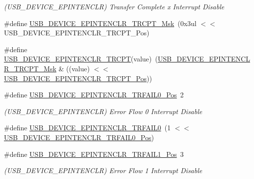 \begin{DoxyCompactItemize}
\begin{DoxyCompactList}\small\item\em (U\+S\+B\+\_\+\+D\+E\+V\+I\+C\+E\+\_\+\+E\+P\+I\+N\+T\+E\+N\+C\+LR) Transfer Complete x Interrupt Disable \end{DoxyCompactList}\item 
\#define \mbox{\hyperlink{group___s_a_m_d21___u_s_b_gaf5f4e9555d58b985f4bbe3f05382c43c}{U\+S\+B\+\_\+\+D\+E\+V\+I\+C\+E\+\_\+\+E\+P\+I\+N\+T\+E\+N\+C\+L\+R\+\_\+\+T\+R\+C\+P\+T\+\_\+\+Msk}}~(0x3ul $<$$<$ U\+S\+B\+\_\+\+D\+E\+V\+I\+C\+E\+\_\+\+E\+P\+I\+N\+T\+E\+N\+C\+L\+R\+\_\+\+T\+R\+C\+P\+T\+\_\+\+Pos)
\item 
\#define \mbox{\hyperlink{group___s_a_m_d21___u_s_b_ga32a91659ae0ef4c5260701d04262d117}{U\+S\+B\+\_\+\+D\+E\+V\+I\+C\+E\+\_\+\+E\+P\+I\+N\+T\+E\+N\+C\+L\+R\+\_\+\+T\+R\+C\+PT}}(value)~(\mbox{\hyperlink{group___s_a_m_d21___u_s_b_gaf5f4e9555d58b985f4bbe3f05382c43c}{U\+S\+B\+\_\+\+D\+E\+V\+I\+C\+E\+\_\+\+E\+P\+I\+N\+T\+E\+N\+C\+L\+R\+\_\+\+T\+R\+C\+P\+T\+\_\+\+Msk}} \& ((value) $<$$<$ \mbox{\hyperlink{group___s_a_m_d21___u_s_b_ga049c9272ae142ffc562966dc3debdd0f}{U\+S\+B\+\_\+\+D\+E\+V\+I\+C\+E\+\_\+\+E\+P\+I\+N\+T\+E\+N\+C\+L\+R\+\_\+\+T\+R\+C\+P\+T\+\_\+\+Pos}}))
\item 
\#define \mbox{\hyperlink{group___s_a_m_d21___u_s_b_gaa64f9c594de2fffaef8e11b9ecaa0efc}{U\+S\+B\+\_\+\+D\+E\+V\+I\+C\+E\+\_\+\+E\+P\+I\+N\+T\+E\+N\+C\+L\+R\+\_\+\+T\+R\+F\+A\+I\+L0\+\_\+\+Pos}}~2
\begin{DoxyCompactList}\small\item\em (U\+S\+B\+\_\+\+D\+E\+V\+I\+C\+E\+\_\+\+E\+P\+I\+N\+T\+E\+N\+C\+LR) Error Flow 0 Interrupt Disable \end{DoxyCompactList}\item 
\#define \mbox{\hyperlink{group___s_a_m_d21___u_s_b_ga6e6a507b0b9d7370dfee72051b6aede7}{U\+S\+B\+\_\+\+D\+E\+V\+I\+C\+E\+\_\+\+E\+P\+I\+N\+T\+E\+N\+C\+L\+R\+\_\+\+T\+R\+F\+A\+I\+L0}}~(1 $<$$<$ \mbox{\hyperlink{group___s_a_m_d21___u_s_b_gaa64f9c594de2fffaef8e11b9ecaa0efc}{U\+S\+B\+\_\+\+D\+E\+V\+I\+C\+E\+\_\+\+E\+P\+I\+N\+T\+E\+N\+C\+L\+R\+\_\+\+T\+R\+F\+A\+I\+L0\+\_\+\+Pos}})
\item 
\#define \mbox{\hyperlink{group___s_a_m_d21___u_s_b_gad7709a825ef24e842364c04f9b99e384}{U\+S\+B\+\_\+\+D\+E\+V\+I\+C\+E\+\_\+\+E\+P\+I\+N\+T\+E\+N\+C\+L\+R\+\_\+\+T\+R\+F\+A\+I\+L1\+\_\+\+Pos}}~3
\begin{DoxyCompactList}\small\item\em (U\+S\+B\+\_\+\+D\+E\+V\+I\+C\+E\+\_\+\+E\+P\+I\+N\+T\+E\+N\+C\+LR) Error Flow 1 Interrupt Disable \end{DoxyCompactList}\item 
$$
\end{DoxyCompactItemize}
